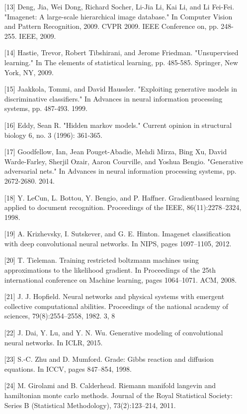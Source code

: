 \begin{itemize}
\item [{[}13{]}] Deng, Jia, Wei Dong, Richard Socher, Li-Jia Li, Kai Li, and Li Fei-Fei. "Imagenet: A large-scale hierarchical image database." In Computer Vision and Pattern Recognition, 2009. CVPR 2009. IEEE Conference on, pp. 248-255. IEEE, 2009.
\item [{[}14{]}] Hastie, Trevor, Robert Tibshirani, and Jerome Friedman. "Unsupervised learning." In The elements of statistical learning, pp. 485-585. Springer, New York, NY, 2009.
\item [{[}15{]}] Jaakkola, Tommi, and David Haussler. "Exploiting generative models in discriminative classifiers." In Advances in neural information processing systems, pp. 487-493. 1999.
\item [{[}16{]}] Eddy, Sean R. "Hidden markov models." Current opinion in structural biology 6, no. 3 (1996): 361-365.
\item [{[}17{]}] Goodfellow, Ian, Jean Pouget-Abadie, Mehdi Mirza, Bing Xu, David Warde-Farley, Sherjil Ozair, Aaron Courville, and Yoshua Bengio. "Generative adversarial nets." In Advances in neural information processing systems, pp. 2672-2680. 2014.
\item [{[}18{]}] Y. LeCun, L. Bottou, Y. Bengio, and P. Haffner. Gradientbased learning applied to document recognition. Proceedings of the IEEE, 86(11):2278–2324, 1998.
\item [{[}19{]}] A. Krizhevsky, I. Sutskever, and G. E. Hinton. Imagenet classification with deep convolutional neural networks. In NIPS, pages 1097–1105, 2012.
\item [{[}20{]}] T. Tieleman. Training restricted boltzmann machines using approximations to the likelihood gradient. In Proceedings of the 25th international conference on Machine learning, pages 1064–1071. ACM, 2008.
\item [{[}21{]}] J. J. Hopfield. Neural networks and physical systems with emergent collective computational abilities. Proceedings of the national academy of sciences, 79(8):2554–2558, 1982. 3, 8
\item [{[}22{]}] J. Dai, Y. Lu, and Y. N. Wu. Generative modeling of convolutional neural networks. In ICLR, 2015.
\item [{[}23{]}] S.-C. Zhu and D. Mumford. Grade: Gibbs reaction and diffusion equations. In ICCV, pages 847–854, 1998.
\item [{[}24{]}] M. Girolami and B. Calderhead. Riemann manifold langevin and hamiltonian monte carlo methods. Journal of the Royal Statistical Society: Series B (Statistical Methodology), 73(2):123–214, 2011.

\end{itemize}
